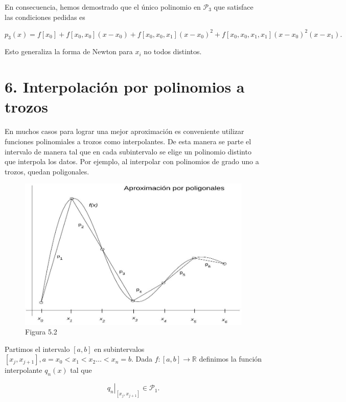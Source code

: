 \documentclass[10pt]{article}
\begin{document}
En consecuencia, hemos demostrado que el único polinomio en $\mathcal{P}_{3}$ que satisface las condiciones pedidas es

$$
p_{3}(x)=f\left[x_{0}\right]+f\left[x_{0}, x_{0}\right]\left(x-x_{0}\right)+f\left[x_{0}, x_{0}, x_{1}\right]\left(x-x_{0}\right)^{2}+f\left[x_{0}, x_{0}, x_{1}, x_{1}\right]\left(x-x_{0}\right)^{2}\left(x-x_{1}\right) .
$$

Esto generaliza la forma de Newton para $x_{i}$ no todos distintos.

\section*{6. Interpolación por polinomios a trozos}
En muchos casos para lograr una mejor aproximación es conveniente utilizar funciones polinomiales a trozos como interpolantes. De esta manera se parte el intervalo de manera tal que en cada subintervalo se elige un polinomio distinto que interpola los datos. Por ejemplo, al interpolar con polinomios de grado uno a trozos, quedan poligonales.

\begin{figure}[h]
\begin{center}
  \includegraphics[width=\textwidth]{2025_09_05_3888c9ac96bd653d96b4g-110}
\captionsetup{labelformat=empty}
\caption{Figura 5.2}
\end{center}
\end{figure}

Partimos el intervalo $[a, b]$ en subintervalos $\left[x_{j}, x_{j+1}\right], a=x_{0}<x_{1}<x_{2} \ldots<x_{n}=b$. Dada $f:[a, b] \rightarrow \mathbb{R}$ definimos la función interpolante $q_{n}(x)$ tal que

$$
\left.q_{n}\right|_{\left[x_{j}, x_{j+1}\right]} \in \mathcal{P}_{1} .
$$
\end{document}
